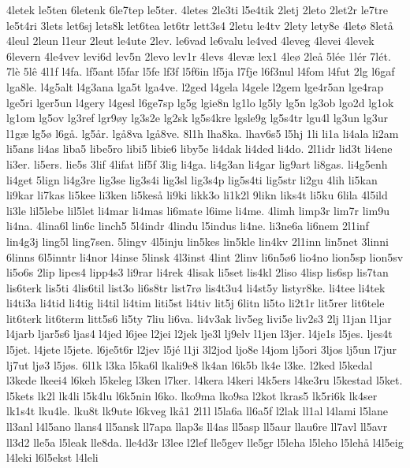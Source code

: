 {4letek
le5ten
6letenk
6le7tep
le5ter.
4letes
2le3ti
l5e4tik
2letj
2leto
2let2r
le7tre
le5t4ri
3lets
let6sj
lets8k
let6tea
let6tr
lett3s4
2letu
le4tv
2lety
lety8e
4let^^f8
8let^^e5
4leul
2leun
l1eur
2leut
le4ute
2lev.
le6vad
le6valu
le4ved
4leveg
4levei
4levek
6levern
4le4vev
levi6d
lev5n
2levo
lev1r
4levs
4lev^^e6
lex1
4le^^f8
2le^^e5
5l^^e9e
1l^^e9r
7l^^e9t.
7l^^e8
5l^^ea
4l1f
l4fa.
lf5ant
l5far
l5fe
lf3f
l5f6in
lf5ja
l7fje
l6f3nul
l4fom
l4fut
2lg
l6gaf
lga8le.
l4g5alt
l4g3ana
lga5t
lga4ve.
l2ged
l4gela
l4gele
l2gem
lge4r5an
lge4rap
lge5ri
lger5un
l4gery
l4gesl
l6ge7sp
lg5g
lgie8n
lg1lo
lg5ly
lg5n
lg3ob
lgo2d
lg1ok
lg1om
lg5ov
lg3ref
lgr9^^f8y
lg3s2e
lg2sk
lg5s4kre
lgsle9g
lg5s4tr
lgu4l
lg3un
lg3ur
l1g^^e6
lg5^^f8
l6g^^e5.
lg5^^e5r.
lg^^e58va
lg^^e58ve.
8l1h
lha8ka.
lhav6s5
l5hj
1li
li1a
li4ala
li2am
li5ans
li4as
liba5
libe5ro
libi5
libie6
liby5e
li4dak
li4ded
li4do.
2l1idr
lid3t
li4ene
li3er.
li5ers.
lie5s
3lif
4lifat
lif5f
3lig
li4ga.
li4g3an
li4gar
lig9art
li8gas.
li4g5enh
li4get
5lign
li4g3re
lig3se
lig3s4i
lig3sl
lig3s4p
lig5s4ti
lig5str
li2gu
4lih
li5kan
li9kar
li7kas
li5kee
li3ken
li5kes^^e5
li9ki
likk3o
li1k2l
9likn
liks4t
li5ku
6lila
4l5ild
li3le
lil5lebe
lil5let
li4mar
li4mas
li6mate
l6ime
li4me.
4limh
limp3r
lim7r
lim9u
li4na.
4lina6l
lin6c
linch5
5l4indr
4lindu
l5indus
li4ne.
li3ne6a
li6nem
2l1inf
lin4g3j
ling5l
ling7sen.
5lingv
4l5inju
lin5kes
lin5kle
lin4kv
2l1inn
lin5net
3linni
6linns
6l5inntr
li4nor
l4inse
5linsk
4l3inst
4lint
2linv
li6n5^^f86
lio4no
lion5sp
lion5sv
li5o6s
2lip
lipes4
lipp4s3
li9rar
li4rek
4lisak
li5set
lis4kl
2liso
4lisp
lis6sp
lis7tan
lis6terk
lis5ti
4lis6til
list3o
li6s8tr
list7r^^f8
lis4t3u4
li4st5y
listyr8ke.
li4tee
li4tek
li4ti3a
li4tid
li4tig
li4til
li4tim
liti5st
li4tiv
lit5j
6litn
li5to
li2t1r
lit5rer
lit6tele
lit6terk
lit6term
litt5s6
li5ty
7liu
li6va.
li4v3ak
liv5eg
livi5e
liv2s3
2lj
l1jan
l1jar
l4jarb
ljar5s6
ljas4
l4jed
l6jee
l2jei
l2jek
lje3l
lj9elv
l1jen
l3jer.
l4je1s
l5jes.
ljes4t
l5jet.
l4jete
l5jete.
l6je5t6r
l2jev
l5j^^e9
l1ji
3l2jod
ljo8e
l4jom
lj5ori
3ljos
lj5un
l7jur
lj7ut
lj^^f83
l5j^^f8s.
6l1k
l3ka
l5ka6l
lkali9e8
lk4an
l6k5b
lk4e
l3ke.
l2ked
l5kedal
l3kede
lkeei4
l6keh
l5keleg
l3ken
l7ker.
l4kera
l4keri
l4k5ers
l4ke3ru
l5kestad
l5ket.
l5kets
lk2l
lk4li
l5k4lu
l6k5nin
l6ko.
lko9ma
lko9sa
l2kot
lkras5
lk5ri6k
lk4ser
lk1s4t
lku4le.
lku8t
lk9ute
l6kveg
lk^^e51
2l1l
l5la6a
ll6a5f
l2lak
ll1al
l4lami
l5lane
ll3anl
l4l5ano
llans4
ll5ansk
ll7apa
llap3s
ll4as
ll5asp
ll5aur
llau6re
ll7avl
ll5avr
ll3d2
lle5a
l5leak
lle8da.
lle4d3r
l3lee
l2lef
lle5gev
lle5gr
l5leha
l5leho
l5leh^^e5
l4l5eig
l4leki
l6l5ekst
l4leli
}
